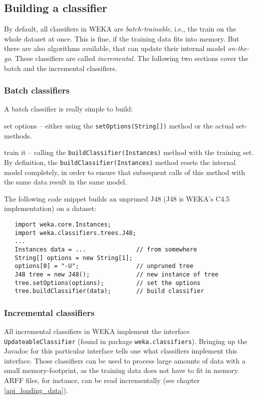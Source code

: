 \subsection{Building a classifier}
By default, all classifiers in WEKA are \textit{batch-trainable}, i.e., the
train on the whole dataset at once. This is fine, if the training data fits
into memory. But there are also algorithms available, that can update their
internal model \textit{on-the-go}. These classifiers are called
\textit{incremental}. The following two sections cover the batch and the
incremental classifiers.

\subsubsection*{Batch classifiers}
A batch classifier is really simple to build:
\begin{tight_itemize}
	\item set options -- either using the \texttt{setOptions(String[])} method
or the actual set-methods.
	\item train it -- calling the \texttt{buildClassifier(Instances)} method
with the training set. By definition, the \texttt{buildClassifier(Instances)}
method resets the internal model completely, in order to ensure that subsequent
calls of this method with the same data result in the same model.
\end{tight_itemize}
The following code snippet builds an unpruned J48 (J48 is WEKA's C4.5
implementation) on a dataset:
\begin{verbatim}
   import weka.core.Instances;
   import weka.classifiers.trees.J48;
   ...
   Instances data = ...              // from somewhere
   String[] options = new String[1];
   options[0] = "-U";                // unpruned tree
   J48 tree = new J48();             // new instance of tree
   tree.setOptions(options);         // set the options
   tree.buildClassifier(data);       // build classifier
\end{verbatim}

\subsubsection*{Incremental classifiers}
All incremental classifiers in WEKA implement the interface
\texttt{UpdateableClassifier} (found in package \texttt{weka.classifiers}).
Bringing up the Javadoc for this particular interface tells one what classifiers
implement this interface. Those classifiers can be used to process large amounts
of data with a small memory-footprint, as the training data does not have to fit
in memory. ARFF files, for instance, can be read incrementally (see chapter
\ref{api_loading_data}).

